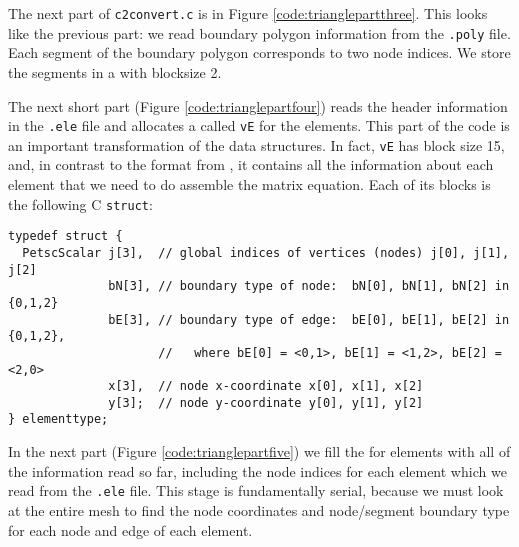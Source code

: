 
The next part of \texttt{c2convert.c} is in Figure \ref{code:trianglepartthree}.  This looks like the previous part: we read boundary polygon information from the \texttt{.poly} file.  Each segment of the boundary polygon corresponds to two node indices.  We store the segments in a \pVec with blocksize 2.


The next short part (Figure \ref{code:trianglepartfour}) reads the header information in the \texttt{.ele} file and allocates a \pVec called \texttt{vE} for the elements.  This part of the code is an important transformation of the data structures.  In fact, \texttt{vE} has block size 15, and, in contrast to the format from \Triangle, it contains all the information about each element that we need to do assemble the matrix equation.  Each of its blocks is the following C \texttt{struct}:
\begin{Verbatim}[fontsize=\small]
typedef struct {
  PetscScalar j[3],  // global indices of vertices (nodes) j[0], j[1], j[2]
              bN[3], // boundary type of node:  bN[0], bN[1], bN[2] in {0,1,2}
              bE[3], // boundary type of edge:  bE[0], bE[1], bE[2] in {0,1,2},
                     //   where bE[0] = <0,1>, bE[1] = <1,2>, bE[2] = <2,0>
              x[3],  // node x-coordinate x[0], x[1], x[2]
              y[3];  // node y-coordinate y[0], y[1], y[2]
} elementtype;
\end{Verbatim}


In the next part (Figure \ref{code:trianglepartfive}) we fill the \pVec for elements with all of the information read so far, including the node indices for each element which we read from the \texttt{.ele} file.  This stage is fundamentally serial, because we must look at the entire mesh to find the node coordinates and node/segment boundary type for each node and edge of each element.

